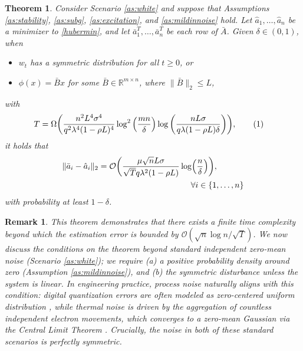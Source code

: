 \documentclass[letterpaper,10pt,conference]{ieeeconf}
\newcommand\numberthis{\addtocounter{equation}{1}\tag{\theequation}}
\theoremstyle{plain} %
\newtheorem{theorem}{Theorem}
\theoremstyle{plain} %
\theoremstyle{plain} %
\theoremstyle{plain}
\newtheorem{remark}{Remark}
\begin{document}
\begin{theorem}\label{noisescenario}
 Consider Scenario \ref{as:white} and suppose that Assumptions \ref{as:stability}, \ref{as:subg},   \ref{as:excitation}, and \ref{as:mildinnoise} hold.  Let $\hat a_1, \dots, \hat a_n$ be a minimizer to \eqref{hubermin}, and let $\bar a_1^T, \dots, \bar a_n^T$ be each row of $\bar A$. 
  Given $\delta\in(0,1)$, when 
    \begin{itemize}
       \item $w_t$ has a symmetric distribution for all $t\ge 0$, or
        \item $\phi(x) = \bar B x$ for some $\bar B\in\mathbb{R}^{m\times n}$, where $\|\bar B\|_2\le L$,
    \end{itemize}
with
 \begin{align*}
    & T = {\Omega} \biggr( \frac{n^2 L^4 \sigma^4 }{ q^2\lambda^4 (1-\rho L)^4} \log^2\left(\frac{mn}{\delta}\right)\log\left( \frac{nL\sigma }{q\lambda (1-\rho L) \delta} \right) \biggr),\numberthis\label{timeboundfinalfinal}
 \end{align*}
 it holds that
\begin{align*}
   & \|\bar a_i - \hat a_i\|_2 = \mathcal{O}\biggr(\frac{\mu \sqrt{n} L \sigma}{\sqrt{T}q\lambda^2 (1-\rho L)}\log\Bigr(\frac{n}{\delta}\Bigr)\biggr), \\&\hspace{55mm}\forall i\in\{1,\dots, n\}
\end{align*}
with probability at least $1-\delta$.
\end{theorem}

\begin{remark}
   This theorem demonstrates that there exists a finite time complexity beyond which the estimation error is bounded by $\mathcal{O}(\sqrt{n}\log n/\sqrt{T})$. 
We now discuss the conditions on the theorem beyond standard independent zero-mean noise (Scenario \ref{as:white}); we require (a)  a  positive probability density around zero (Assumption \ref{as:mildinnoise}), and (b) the symmetric disturbance unless the system is linear. 
In engineering practice, process noise naturally aligns with this condition: digital quantization errors are often modeled as zero-centered uniform distribution \cite{widrow2008quantization}, while thermal noise is driven by the aggregation of countless independent electron movements, which converges to a zero-mean Gaussian via the Central Limit Theorem \cite{vasilescu2005electronic}. Crucially, the noise in both of these standard scenarios is perfectly symmetric.
\end{remark}
\end{document}
